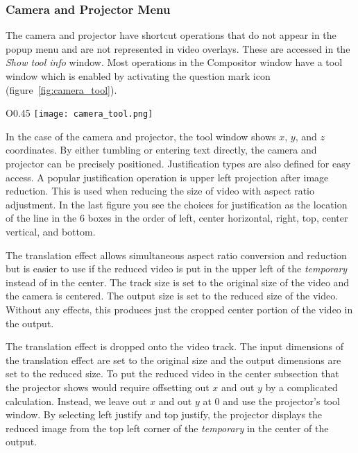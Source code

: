 \subsubsection*{Camera and Projector Menu}%
\label{ssub:camera_and_projector_menu}

The camera and projector have shortcut operations that do not appear in the popup menu and are not represented in video overlays. 
These are accessed in the \emph{Show tool info} window.
Most operations in the Compositor window have a tool window which is enabled by activating the question mark icon (figure~\ref{fig:camera_tool}).

\begin{wrapfigure}[10]{O}{0.45\linewidth} 
	\vspace{1ex}
    \texttt{[image: camera\_tool.png]}
    \caption{Camera and Projector tool}
    \label{fig:camera_tool}
\end{wrapfigure}

In the case of the camera and projector, the tool window shows $x$, $y$, and $z$ coordinates. 
By either tumbling or entering text directly, the camera and projector can be precisely positioned.  
Justification types are also defined for easy access. 
A popular justification operation is upper left projection after image reduction. 
This is used when reducing the size of video with aspect ratio adjustment.  
In the last figure you see the choices for justification as the location of the line in the 6 boxes in the order of left, center horizontal, right, top, center vertical, and bottom.

The translation effect allows simultaneous aspect ratio conversion and reduction but is easier to use if the reduced video is put in the upper left of the \textit{temporary} instead of in the center. 
The track size is set to the original size of the video and the camera is centered. 
The output size is set to the reduced size of the video. 
Without any effects, this produces just the cropped center portion of the video in the output.

The translation effect is dropped onto the video track. The input dimensions of the translation effect are set to the original size and the output dimensions are set to the reduced size. 
To put the reduced video in the center subsection that the projector shows would require offsetting out $x$ and out $y$ by a complicated calculation. 
Instead, we leave out $x$ and out $y$ at 0 and use the projector's tool window. 
By selecting left justify and top justify, the projector displays the reduced image from the top left corner of the \textit{temporary} in the center of the output.


